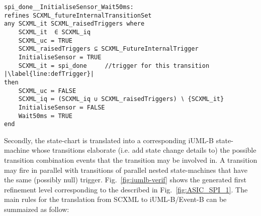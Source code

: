 \begin{lstlisting}[caption={Event-B event corresponding to internal triggered transition to \textbf{Wait50ms} state in refinement level 1 shown in Fig.~\ref{fig:ASIC}}, label={lst:SecBotMach0},language=Event-B, escapechar=|, frame=single, float=t]
spi_done__InitialiseSensor_Wait50ms:	
refines SCXML_futureInternalTransitionSet 
any SCXML_it SCXML_raisedTriggers where
	SCXML_it  ∈ SCXML_iq 
	SCXML_uc = TRUE
	SCXML_raisedTriggers ⊆ SCXML_FutureInternalTrigger
	InitialiseSensor = TRUE
	SCXML_it = spi_done  	//trigger for this transition |\label{line:defTrigger}|
then
	SCXML_uc ≔ FALSE
	SCXML_iq ≔ (SCXML_iq ∪ SCXML_raisedTriggers) ∖ {SCXML_it}
	InitialiseSensor ≔ FALSE
	Wait50ms ≔ TRUE
end
\end{lstlisting}

Secondly, the \SCXML state-chart is translated into a corresponding iUML-B state-machine whose transitions elaborate (i.e. add state change details to) the possible transition combination events that the transition may be involved in. 
A transition may fire in parallel with transitions of parallel nested state-machines that have the same (possibly null) trigger.
Fig.~\ref{fig:iumlb-verif} shows the generated \iUMLB first refinement level corresponding to the \IDS described in Fig.~\ref{fig:ASIC_SPI_1}. 
The main rules for the translation from SCXML to iUML-B/Event-B can be summaized as follow:

